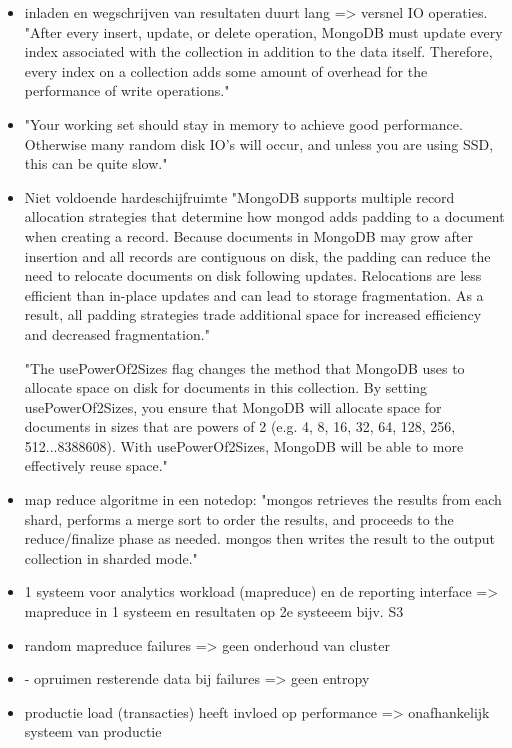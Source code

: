 \begin{itemize}
    \item inladen en wegschrijven van resultaten duurt lang => versnel IO operaties. "After every insert, update, or delete operation, MongoDB must update every index associated with the collection in addition to the data itself. Therefore, every index on a collection adds some amount of overhead for the performance of write operations."
    
    \item "Your working set should stay in memory to achieve good performance. Otherwise many random disk IO’s will occur, and unless you are using SSD, this can be quite slow." 
    
    \item Niet voldoende hardeschijfruimte
    "MongoDB supports multiple record allocation strategies that determine how mongod adds padding to a document when creating a record. Because documents in MongoDB may grow after insertion and all records are contiguous on disk, the padding can reduce the need to relocate documents on disk following updates. Relocations are less efficient than in-place updates and can lead to storage fragmentation. As a result, all padding strategies trade additional space for increased efficiency and decreased fragmentation." %
    
    "The usePowerOf2Sizes flag changes the method that MongoDB uses to allocate space on disk for documents in this collection. By setting usePowerOf2Sizes, you ensure that MongoDB will allocate space for documents in sizes that are powers of 2 (e.g. 4, 8, 16, 32, 64, 128, 256, 512...8388608). With usePowerOf2Sizes, MongoDB will be able to more effectively reuse space."
    
    \item map reduce algoritme in een notedop:
    "mongos retrieves the results from each shard, performs a merge sort to order the results, and proceeds to the reduce/finalize phase as needed. mongos then writes the result to the output collection in sharded mode."
    
    \item 1 systeem voor analytics workload (mapreduce) en de reporting interface => mapreduce in 1 systeem en resultaten op 2e systeeem bijv. S3
    
    \item random mapreduce failures => geen onderhoud van cluster
    \item - opruimen resterende data bij failures => geen entropy
    \item productie load (transacties) heeft invloed op performance => onafhankelijk systeem van productie
\end{itemize}



